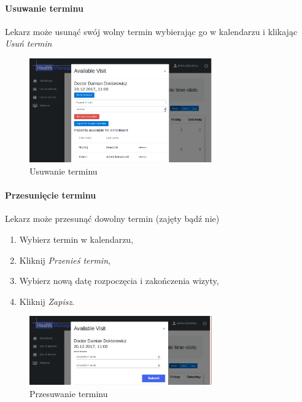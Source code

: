 \documentclass[polish,12pt]{aghthesis}
\begin{document}
    \paragraph{Usuwanie terminu}{
    Lekarz może usunąć swój wolny termin wybierając go w kalendarzu i klikając \emph{Usuń termin}
        \begin{figure}[H]
        \includegraphics[width=0.7\textwidth]{gui-doc-unenrolled}
        \caption{Usuwanie terminu}
        \end{figure}  
    }
    \paragraph{Przesunięcie terminu}{
    Lekarz może przesunąć dowolny termin (zajęty bądź nie)
    \begin{enumerate}
      \item Wybierz termin w kalendarzu,
      \item Kliknij \emph{Przenieś termin},
      \item Wybierz nową datę rozpoczęcia i zakończenia wizyty,
      \item Kliknij \emph{Zapisz}.
    \end{enumerate}
        \begin{figure}[H]
        \includegraphics[width=0.7\textwidth]{gui-doc-moveslot}
        \caption{Przesuwanie terminu}
        \end{figure}  
    }
\end{document}
